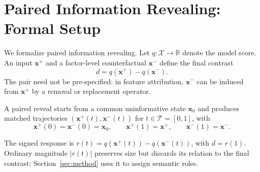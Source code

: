 \section{Paired Information Revealing: Formal Setup}
\label{sec:setup}

We formalize paired information revealing. Let
$q:\mathcal{X}\rightarrow\mathbb{R}$ denote the model score.
An input $\mathbf{x}^{+}$ and a factor-level counterfactual
$\mathbf{x}^{-}$ define the final contrast
\[
d=q(\mathbf{x}^{+})-q(\mathbf{x}^{-}).
\]
The pair need not be pre-specified: in feature attribution,
$\mathbf{x}^{-}$ can be induced from $\mathbf{x}^{+}$ by a
removal or replacement operator.

A paired reveal starts from a common uninformative state $\mathbf{x}_0$
and produces matched trajectories
$(\mathbf{x}^{+}(t),\mathbf{x}^{-}(t))$ for $t\in \mathcal{T}=[0,1]$, with
\[
\mathbf{x}^{+}(0)=\mathbf{x}^{-}(0)=\mathbf{x}_0,\qquad
\mathbf{x}^{+}(1)=\mathbf{x}^{+},\qquad
\mathbf{x}^{-}(1)=\mathbf{x}^{-}.
\]

The signed response is
$r(t)=q(\mathbf{x}^{+}(t))-q(\mathbf{x}^{-}(t))$, with $d=r(1)$.
Ordinary magnitude $|r(t)|$ preserves size but discards its
relation to the final contrast; Section~\ref{sec:method} uses it
to assign semantic roles.